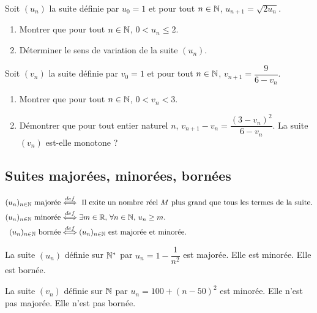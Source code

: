 \documentclass[a4paper,11pt,DIV20,BCOR0mm]{scrartcl}
\begin{document}
\begin{exercice}
 Soit $(u_n)$ la suite définie par $u_0=1$ et pour
 tout $n\in\mathbb{N}$, $u_{n+1}=\sqrt{2u_n}$.
 \begin{enumerate}
  \item Montrer que pour tout $n\in\mathbb{N}$, $0<u_n\leq2$.
  \item Déterminer le sens de variation de la suite $(u_n)$.
 \end{enumerate}

\end{exercice}


\begin{exercice}
 Soit $(v_n)$ la suite définie par $v_0=1$ et pour
 tout $n\in\mathbb{N}$, $v_{n+1}=\dfrac{9}{6-v_n}$.
 \begin{enumerate}
  \item Montrer que pour tout $n\in\mathbb{N}$, $0<v_n<3$.
  \item Démontrer que pour tout entier naturel $n$, $v_{n+1}-v_n = \dfrac{\left(3-v_n\right)^2}{6-v_n}$.
  La suite $(v_n)$ est-elle monotone ?
 \end{enumerate}
\end{exercice}


\subsection{Suites majorées, minorées, bornées}
\begin{definition}
 \begin{align*}
  (u_n)_{n\in\mathbb{N}}\text{ majorée}&\stackrel{def}{\Longleftrightarrow}\text{ Il exite un nombre réel $M$ plus
 grand que tous les termes de la suite.}\\
  (u_n)_{n\in\mathbb{N}}\text{ minorée}&\stackrel{def}{\Longleftrightarrow}\exists m\in\mathbb{R},\,\forall n\in\mathbb{N},\,u_n\geq m.\\
(u_n)_{n\in\mathbb{N}}\text{ bornée}&\stackrel{def}{\Longleftrightarrow}(u_n)_{n\in\mathbb{N}}\text{ est majorée et minorée.}
\end{align*}
\end{definition}
\begin{exemple}
 La suite $(u_n)$ définie sur $\mathbb{N}^*$ par $u_n=1-\dfrac1{n^2}$ est majorée. Elle est minorée.
Elle est bornée.
\end{exemple}

\begin{exemple}
 La suite $(v_n)$ définie sur $\mathbb{N}$ par $u_n=100+(n-50)^2$ est minorée. Elle n'est pas majorée.
Elle n'est pas bornée.
\end{exemple}
\end{document}
